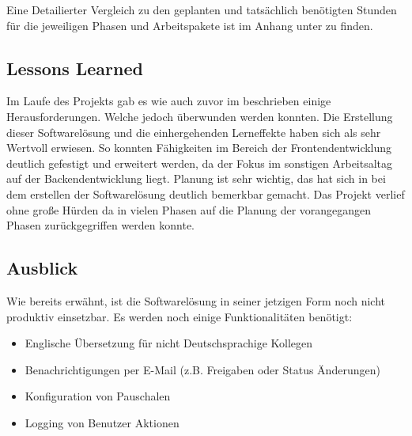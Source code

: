Eine Detailierter Vergleich zu den geplanten und tatsächlich benötigten Stunden für die jeweiligen Phasen und Arbeitspakete ist im Anhang unter  zu finden.

\subsection{Lessons Learned}
\label{sec:Abschlussphase:Lessons Learned}

Im Laufe des Projekts gab es wie auch zuvor im  beschrieben einige Herausforderungen. Welche jedoch überwunden werden konnten. Die Erstellung dieser Softwarelösung und die einhergehenden Lerneffekte haben sich als sehr Wertvoll erwiesen. So konnten Fähigkeiten im Bereich der Frontendentwicklung deutlich gefestigt und erweitert werden, da der Fokus im sonstigen Arbeitsaltag auf der Backendentwicklung liegt. Planung ist sehr wichtig, das hat sich in bei dem erstellen der Softwarelösung deutlich bemerkbar gemacht. Das Projekt verlief ohne große Hürden da in vielen Phasen auf die Planung der vorangegangen Phasen zurückgegriffen werden konnte.

\subsection{Ausblick}
\label{sec:Abschlussphase:Ausblick}
Wie bereits erwähnt, ist die Softwarelösung in seiner jetzigen Form noch nicht produktiv einsetzbar. Es werden noch einige Funktionalitäten benötigt:

\begin{itemize}
    \item Englische Übersetzung für nicht Deutschsprachige Kollegen
    \item Benachrichtigungen per E-Mail (z.B. Freigaben oder Status Änderungen)
    \item Konfiguration von Pauschalen
    \item Logging von Benutzer Aktionen
\end{itemize}
